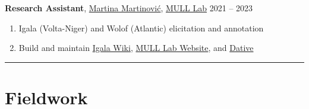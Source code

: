 \documentclass[margin,line]{resume}
\begin{document}
\begin{resume}
	\textbf{Research Assistant}, \href{https://inamartinovic.com/}{Martina Martinović}, \href{https://mull-lab.org/}{MULL Lab} \hfill 2021 -- 2023
	\begin{enumerate}[-, leftmargin=1em, topsep=4pt]
		\item[] Igala (Volta-Niger) and Wolof (Atlantic) elicitation and annotation
		\item[] Build and maintain \href{https://wiki.mull-lab.org/Igala/}{Igala Wiki}, \href{https://mull-lab.org/}{MULL Lab Website}, and \href{https://github.com/dativebase/dativerf}{Dative}
	\end{enumerate}%

	\begin{comment}
	\textbf{Full Stack and Mobile Developer}, \href{https://playmind.com/}{PLAYMIND}, Montréal \hfill Mar -- Aug 2021
	\begin{enumerate}[-, leftmargin=1em, topsep=4pt]
		\item[] Developed~\href{https://playbox.games/\#home}{
			      PLAYBOX online management portal and Android App}
	\end{enumerate}

	\textbf{Freelance Programmer}, Montréal \hfill 2019 -- 2020
	\begin{enumerate}[-, leftmargin=1em, topsep=4pt]
		\item[] Web Development and Python tutoring
	\end{enumerate}

	\textbf{Junior Developer}, \href{https://gls-canada.com/en/dicom/corp/home}{GLS (\textit{fka} Dicom)}, Montréal \hfill Jan -- May 2019
	\begin{enumerate}[-, leftmargin=1em, topsep=4pt]
		\item[] Worked on \href{https://gls-canada.com/en/dicom/about-us/news/dicom-launches-smart4-shipping}{smart4 shipping platform} back-end
	\end{enumerate}
	\end{comment}

	\vspace{-0.9em}\rule{\textwidth}{0.4pt}



	\section{\mysidestyle Fieldwork}


\end{resume}
\end{document}
